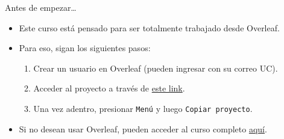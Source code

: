 \documentclass[11pt, handout]{beamer}
\begin{document}
\begin{frame}{Antes de empezar\ldots}
	\begin{itemize}
		\item Este curso está pensado para ser totalmente trabajado desde Overleaf.
		\vfill
		
		\item Para eso, sigan los siguientes pasos:\smallskip
			\begin{enumerate}
				\item Crear un usuario en Overleaf (pueden ingresar con su correo UC).\smallskip
				
				\item Acceder al proyecto a través de \href{https://www.overleaf.com/read/fxyhkqyndsrx}{este link}.\smallskip
				
				\item Una vez adentro, presionar \texttt{Menú} y luego \texttt{Copiar proyecto}.
				
				
			\end{enumerate}
		\vfill
		
		\item Si no desean usar Overleaf, pueden acceder al curso completo \href{https://github.com/pipeton8/latex-course}{aquí}. 
	\end{itemize}

\end{frame}
\end{document}
